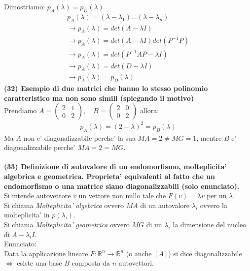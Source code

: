 \documentclass[10pt]{extarticle}
\begin{document}
Dimostriamo: $p_A(\lambda)=p_D(\lambda)$
\begin{align*}
    p_A(\lambda)=(\lambda - \lambda_1)\dots(\lambda - \lambda_n) \\
    \to p_A(\lambda)= det(A -\lambda I) \\
    \to p_A(\lambda)= det(A -\lambda I)det(P^{-1}P) \\
    \to p_A(\lambda)= det(P^{-1}AP -\lambda I) \\
    \to p_A(\lambda)= det(D -\lambda I) \\
    \to p_A(\lambda)=p_D(\lambda)
\end{align*}
\textbf{(32) Esempio di due matrici che hanno lo stesso polinomio caratteristico ma non sono simili (spiegando il motivo)} \\
Prendiamo $A=\begin{pmatrix}
    2 & 1 \\ 0 & 2
\end{pmatrix}, \quad B=\begin{pmatrix}
    2 & 0 \\ 0 & 2
\end{pmatrix}$ allora:
\begin{align*}
    p_A(\lambda)=(2-\lambda)^2=p_B(\lambda)
\end{align*}
Ma $A$ non e' diagonalizzabile perche' la sua $MA=2\neq MG=1$, mentre $B$ e' diagonalizzabile perche' $MA=2=MG$.\\
\vspace{1em}\\
\textbf{(33) Definizione di autovalore di un endomorfismo, molteplicita' algebrica e geometrica. Proprieta' equivalenti al fatto che un endomorfismo o una matrice siano diagonalizzabili (solo enunciato).} \\
Si intende autovettore $v$ un vettore non nullo tale che $F(v)=\lambda v$ per un $\lambda$. \\
Si chiama \textit{Molteplicita' algebrica} ovvero $MA$ di un autovalore $\lambda_i$  ovvero la molteplicita' in $p(\lambda_i)$. \\
Si chiama \textit{Molteplicita' geometrica} ovvero $MG$ di un $\lambda_i$ la dimensione del nucleo di $A-\lambda_i I$. \\
Enunciato: \\
Data la applicazione lineare $F : \mathbb{R}^n \to \mathbb{R}^n$ (o anche $[A]$) si dice diagonalizzabile $\iff$ esiste una base $B$ composta da $n$ autovettori. \\
\vspace{1em}\\
\end{document}
